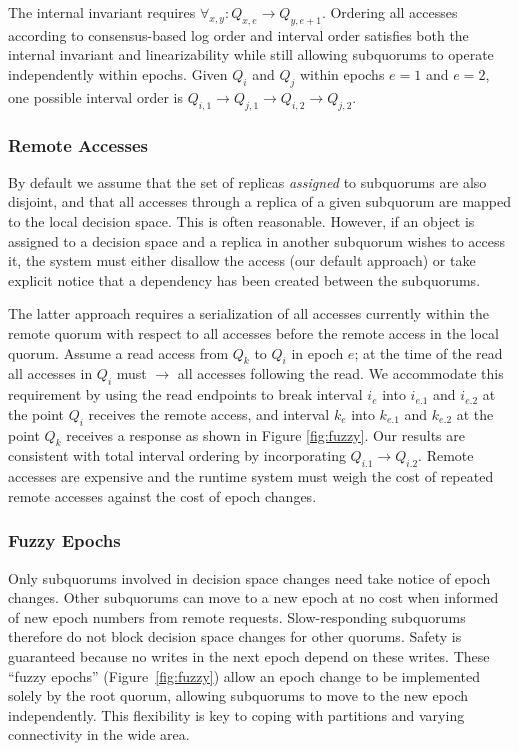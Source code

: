 \documentclass[sigconf]{acmart}
\begin{document}
The internal invariant requires $\forall_{x,y} : Q_{x,e} \rightarrow Q_{y,e+1}$.
Ordering all accesses according to consensus-based log order and interval order satisfies both the
internal invariant and linearizability  while still allowing subquorums to operate
independently within epochs.
Given $Q_i$ and $Q_j$ within epochs $e=1$ and $e=2$, one possible interval order is
$Q_{i,1} \rightarrow Q_{j,1} \rightarrow Q_{i,2} \rightarrow Q_{j,2}$.

\subsubsection{Remote Accesses}
\label{sec:remote}

By default we assume that the set of replicas \emph{assigned} to subquorums are also
disjoint, and that all accesses through a replica of a given subquorum are mapped to the
local decision space.
This is often reasonable.
However, if an object is assigned to a decision space and a replica in another subquorum
wishes to
access it, the system must either disallow the access (our default approach) or take
explicit notice that a dependency has been created between the subquorums.

The latter approach requires a serialization of all accesses currently within the remote
quorum with respect to all accesses before the remote access in the local quorum.
Assume a read access from $Q_k$ to $Q_i$ in epoch $e$; at the time of the read all
accesses in $Q_i$ must $\rightarrow$ all accesses following the read.
We accommodate this requirement by using the read endpoints to break interval $i_e$ into
$i_{e.1}$ and $i_{e.2}$ at the point $Q_i$ receives the remote access, and interval $k_e$
into $k_{e.1}$ and $k_{e.2}$ at the point $Q_k$ receives a response as shown in
Figure \ref{fig:fuzzy}.
Our results are consistent with total interval ordering by incorporating $Q_{i.1}
\rightarrow Q_{i.2}$.
Remote accesses are expensive and the runtime system must weigh the cost of repeated
remote accesses against the cost of epoch changes.

\subsubsection{Fuzzy Epochs}

Only subquorums involved in decision space changes need take notice of
epoch changes.
Other subquorums can move to a new epoch at no cost when informed of new epoch
numbers from remote requests.
Slow-responding subquorums therefore do not block decision space changes for other
quorums.
Safety is guaranteed because no writes in the next epoch depend on these writes.
These ``fuzzy epochs'' (Figure~\ref{fig:fuzzy}) allow an epoch change to be implemented solely by the
root quorum, allowing subquorums to move to the new epoch independently.
This flexibility is key to coping with partitions and varying connectivity in
the wide area.
\end{document}

